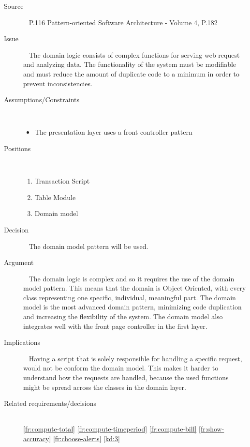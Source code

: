\begin{description}
\item [Source]~
\EAA  \cite{Fowler:2002:PEA:579257} P.116
Pattern-oriented Software Architecture - Volume 4, P.182 \cite{wiley-4}

\item [Issue]~
The domain logic consists of complex functions for serving web request and analyzing data. The functionality of the system must be modifiable and must reduce the amount of duplicate code to a minimum in order to prevent inconsistencies.

\item [Assumptions/Constraints]~
\begin{itemize}
\item The presentation layer uses a front controller pattern
\end{itemize}

\item [Positions]~
\begin{enumerate}
\item Transaction Script
\item Table Module
\item Domain model
\end{enumerate}

\item [Decision] ~
The domain model pattern will be used.

\item [Argument]~
The domain logic is complex and so it requires the use of the domain model pattern. This means that the domain is Object Oriented, with every class representing one specific, individual, meaningful part. The domain model is the most advanced domain pattern, minimizing code duplication and increasing the flexibility of the system. The domain model also integrates well with the front page controller in the first layer.

\item [Implications]~
Having a script that is solely responsible for handling a specific request, would not be conform the domain model. This makes it harder to understand how the requests are handled, because the used functions might be spread across the classes in the domain layer.

\item [Related requirements/decisions]~\\
\ref{fr:compute-total} \ref{fr:compute-timeperiod} \ref{fr:compute-bill}  \ref{fr:show-accuracy} \ref{fr:choose-alerts} \ref{kd:3}
 
%
\end{description}


